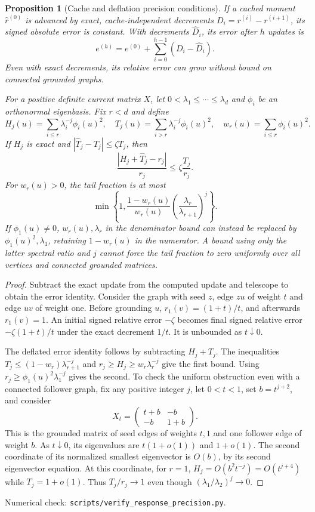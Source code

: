 \documentclass[11pt]{article}
\newtheorem{proposition}[theorem]{Proposition}
\begin{document}
\begin{proposition}[Cache and deflation precision conditions]
\label{prop:responsescope}
If a cached moment $\widehat r^{(0)}$ is advanced by exact,
cache-independent decrements $D_i=r^{(i)}-r^{(i+1)}$, its signed
absolute error is constant. With decrements $\widehat D_i$, its
error after $h$ updates is
\[
 e^{(h)}=e^{(0)}+\sum_{i=0}^{h-1}(D_i-\widehat D_i).
\]
Even with exact decrements, its relative error can grow without bound
on connected grounded graphs.

For a positive definite current matrix $X$, let
$0<\lambda_1\leq\cdots\leq\lambda_d$ and $\phi_i$ be an orthonormal
eigenbasis. Fix $r<d$ and define
\[
 H_j(u)=\sum_{i\leq r}\lambda_i^{-j}\phi_i(u)^2,\quad
 T_j(u)=\sum_{i>r}\lambda_i^{-j}\phi_i(u)^2,\quad
 w_r(u)=\sum_{i\leq r}\phi_i(u)^2.
\]
If $H_j$ is exact and $|\widehat T_j-T_j|\leq\zeta T_j$, then
\[
 \frac{|H_j+\widehat T_j-r_j|}{r_j}
 \leq\zeta\frac{T_j}{r_j}.
\]
For $w_r(u)>0$, the tail fraction is at most
\[
 \min\left\{1,\frac{1-w_r(u)}{w_r(u)}
                  \left(\frac{\lambda_r}{\lambda_{r+1}}\right)^j\right\}.
\]
If $\phi_1(u)\ne0$, $w_r(u),\lambda_r$ in the denominator bound
can instead be replaced by $\phi_1(u)^2,\lambda_1$, retaining
$1-w_r(u)$ in the numerator. A bound using only the latter
spectral ratio and $j$ cannot force the tail fraction to zero
uniformly over all vertices and connected grounded matrices.
\end{proposition}
\begin{proof}
Subtract the exact update from the computed update and telescope
to obtain the error identity. Consider the graph with seed $z$,
edge $zu$ of weight $t$ and edge $uv$ of weight one. Before
grounding $u$, $r_1(v)=(1+t)/t$, and afterwards $r_1(v)=1$.
An initial signed relative error $-\zeta$ becomes final signed
relative error $-\zeta(1+t)/t$ under the exact decrement $1/t$.
It is unbounded as $t\downarrow0$.

The deflated error identity follows by subtracting $H_j+T_j$.
The inequalities $T_j\leq(1-w_r)\lambda_{r+1}^{-j}$ and
$r_j\geq H_j\geq w_r\lambda_r^{-j}$ give the first bound.
Using $r_j\geq\phi_1(u)^2\lambda_1^{-j}$ gives the second.
To check the uniform obstruction even with a connected follower
graph, fix any positive integer $j$, let $0<t<1$, set $b=t^{j+2}$,
and consider
\[
 X_t=\begin{pmatrix}t+b&-b\\-b&1+b\end{pmatrix}.
\]
This is the grounded matrix of seed edges of weights $t,1$ and
one follower edge of weight $b$. As $t\downarrow0$, its eigenvalues
are $t(1+o(1))$ and $1+o(1)$. The second coordinate of its normalized
smallest eigenvector is $O(b)$, by its second eigenvector equation.
At this coordinate, for $r=1$, $H_j=O(b^2t^{-j})=O(t^{j+4})$
while $T_j=1+o(1)$. Thus $T_j/r_j\to1$ even though
$(\lambda_1/\lambda_2)^j\to0$.
\end{proof}
\noindent Numerical check: \texttt{scripts/verify\_response\_precision.py}.
\end{document}
